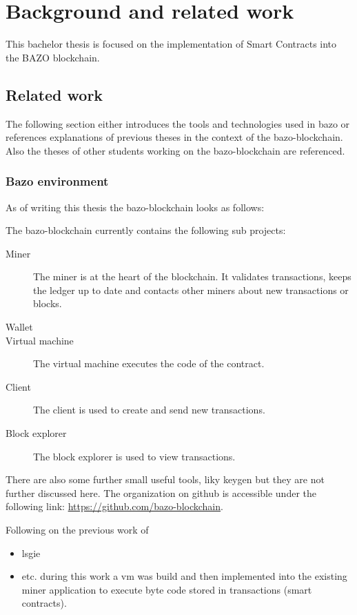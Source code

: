\chapter{Background and related work}
\thispagestyle{main} %
This bachelor thesis is focused on the implementation of Smart Contracts into the BAZO blockchain.
\section{Related work}
The following section either introduces the tools and technologies used in bazo or references explanations of previous theses in the context of the bazo-blockchain. Also the theses of other students working on the bazo-blockchain are referenced.

\subsection{Bazo environment}
As of writing this thesis the bazo-blockchain looks as follows:

The bazo-blockchain currently contains the following sub projects:
\begin{description}
  \item[Miner] The miner is at the heart of the blockchain. It validates transactions, keeps the ledger up to date and contacts other miners about new transactions or blocks.
  \item[Wallet] 
  \item[Virtual machine] The virtual machine executes the code of the contract.
  \item[Client] The client is used to create and send new transactions.
  \item[Block explorer] The block explorer is used to view transactions.
\end{description}

There are also some further small useful tools, liky keygen but they are not further discussed here. The organization on github is accessible under the following link: \href{https://github.com/bazo-blockchain}{https://github.com/bazo-blockchain}.

Following on the previous work of 
\begin{itemize}
	\item lsgie
	\item etc. during this work a vm was build and then implemented into the existing miner application to execute byte code stored in transactions (smart contracts).
\end{itemize}

